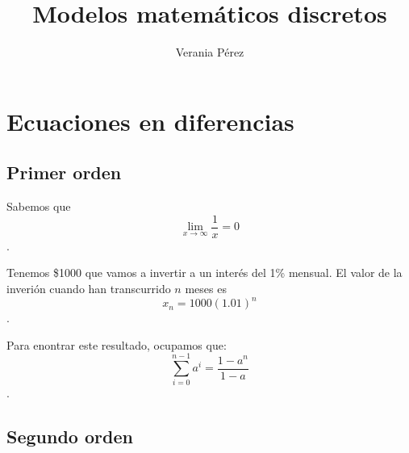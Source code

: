 \documentclass{article}
\title{Modelos matemáticos discretos}
\author{Verania Pérez}
\begin{document}
\maketitle
\section{Ecuaciones en diferencias}
\subsection{Primer orden}

Sabemos que $$\lim_{x\to\infty}\frac{1}{x}=0$$.

Tenemos \$1000 que vamos a invertir a un interés del 1\% mensual.
El valor de la inverión cuando han transcurrido $n$ meses es $$x_n=1000(1.01)^n$$.

Para enontrar este resultado, ocupamos que:
$$\sum_{i=0}^{n-1}a^{i}=\frac{1-a^{n}}{1-a}$$.
\subsection{Segundo orden}
\end{document}
